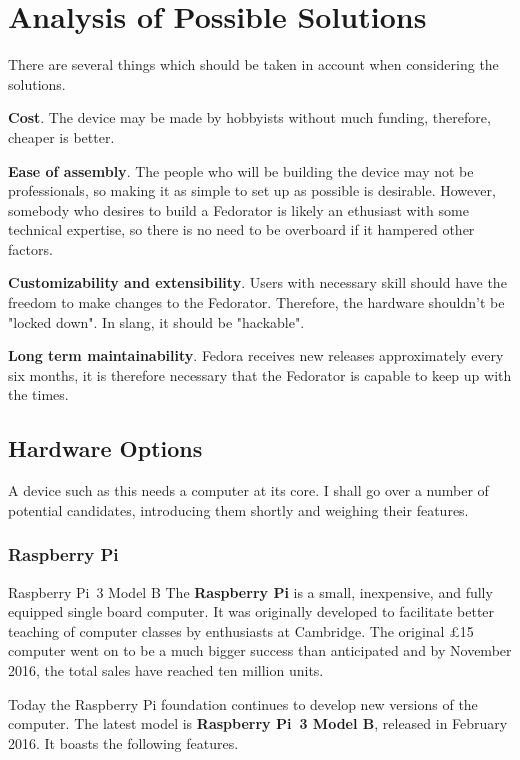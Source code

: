 \chapter{Analysis of Possible Solutions}
    There are several things which should be taken in account when considering the solutions.
    
    \textbf{Cost}.  The device may be made by hobbyists without much funding, therefore, cheaper is better.
    
    \textbf{Ease of assembly}.  The people who will be building the device may not be professionals, so making it as simple to set up as possible is desirable.  However, somebody who desires to build a Fedorator is likely an ethusiast with some technical expertise, so there is no need to be overboard if it hampered other factors.
    
    \textbf{Customizability and extensibility}.  Users with necessary skill should have the freedom to make changes to the Fedorator.  Therefore, the hardware shouldn't be "locked down".  In slang, it should be "hackable".
    
    \textbf{Long term maintainability}.  Fedora receives new releases approximately every six months\cite{fedora-release-life-cycle}, it is therefore necessary that the Fedorator is capable to keep up with the times.
    
    \section{Hardware Options}
        A device such as this needs a computer at its core.  I shall go over a number of potential candidates, introducing them shortly and weighing their features.
        \subsection{Raspberry Pi}
                {Raspberry Pi~3 Model B \cite{rpi-pimoroni}}
            The \textbf{Raspberry Pi} is a small, inexpensive, and fully equipped single board computer.  It was originally developed to facilitate better teaching of computer classes by enthusiasts at Cambridge\cite{bbc-15-pound-computer}.  The original £15 computer went on to be a much bigger success than anticipated and by November 2016, the total sales have reached ten million units\cite{rpi-ten-million}.
            
            Today the Raspberry Pi foundation continues to develop new versions of the computer\cite{rpi-products}.  The latest model is \textbf{Raspberry Pi~3 Model B}, released in February 2016.  It boasts the following features\cite{rpi-3}.
            

